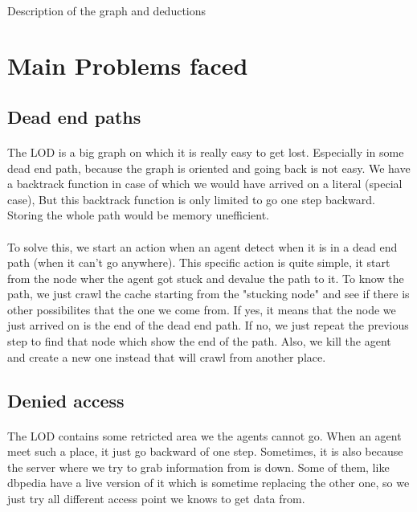 \documentclass{article}
\begin{document}
		\paragraph{}
			Description of the graph and deductions

\section{Main Problems faced}
	\subsection{Dead end paths}
		\paragraph{}
			The LOD is a big graph on which it is really easy to get lost.
			Especially in some dead end path, because the graph is oriented and going back is not easy.
			We have a backtrack function in case of which we would have arrived on a literal (special case),
			But this backtrack function is only limited to go one step backward.
			Storing the whole path would be memory unefficient.
		\paragraph{}
			To solve this, we start an action when an agent detect when it is in a dead end path (when it can't go anywhere).
			This specific action is quite simple, it start from the node wher the agent got stuck and devalue the path to it.
			To know the path, we just crawl the cache starting from the "stucking node"
			and see if there is other possibilites that the one we come from.
			If yes, it means that the node we just arrived on is the end of the dead end path.
			If no, we just repeat the previous step to find that node which show the end of the path.
			Also, we kill the agent and create a new one instead that will crawl from another place.
	\subsection{Denied access}
		\paragraph{}
			The LOD contains some retricted area we the agents cannot go.
			When an agent meet such a place, it just go backward of one step.
			Sometimes, it is also because the server where we try to grab information from is down.
			Some of them, like dbpedia have a live version of it which is sometime replacing the other one,
			so we just try all different access point we knows to get data from.
\end{document}
